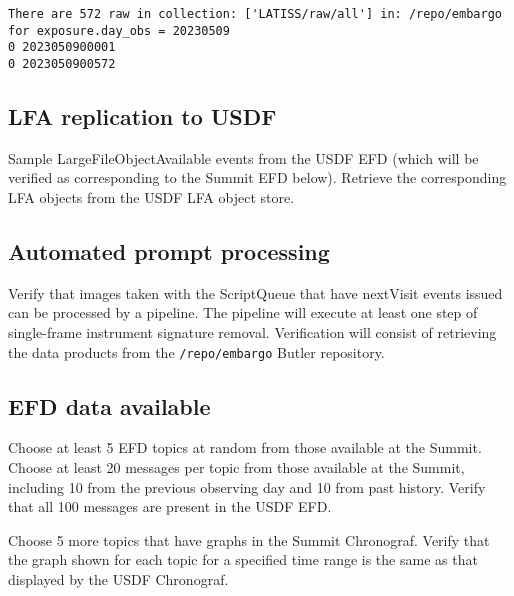 \begin{verbatim}
There are 572 raw in collection: ['LATISS/raw/all'] in: /repo/embargo for exposure.day_obs = 20230509
0 2023050900001
0 2023050900572
\end{verbatim}

\subsection{LFA replication to USDF }
Sample LargeFileObjectAvailable events from the USDF EFD (which will be verified as corresponding to the Summit EFD below).
Retrieve the corresponding LFA objects from the USDF LFA object store.

\subsection{Automated prompt processing}
Verify that images taken with the ScriptQueue that have nextVisit events issued can be processed by a pipeline.
The pipeline will execute at least one step of single-frame instrument signature removal.
Verification will consist of retrieving the data products from the \texttt{/repo/embargo} Butler repository.

\subsection{EFD data available }
Choose at least 5 EFD topics at random from those available at the Summit.
Choose at least 20 messages per topic from those available at the Summit, including 10 from the previous observing day and 10 from past history.
Verify that all 100 messages are present in the USDF EFD.

Choose 5 more topics that have graphs in the Summit Chronograf.
Verify that the graph shown for each topic for a specified time range is the same as that displayed by the USDF Chronograf.
